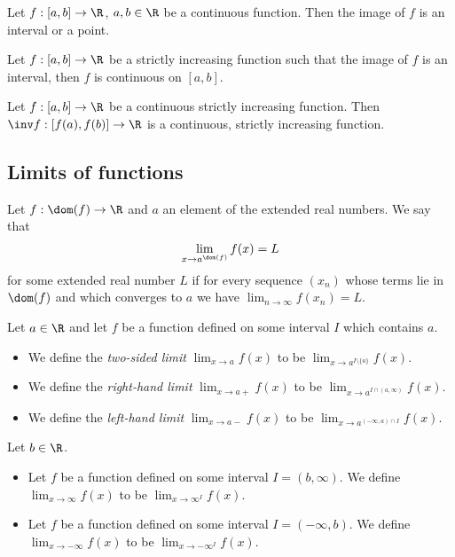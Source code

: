 \documentclass{article}
\begin{document}
\setcounter{theorem}{8}
\begin{theorem}
    Let $f:[a,b]\to\R$, $a,b\in\R$ be a continuous function. Then the
    image of $f$ is an interval or a point.
\end{theorem}

\begin{theorem}
    Let $f:[a,b]\to\R$ be a strictly increasing function such that
    the image of $f$ is an interval, then $f$ is continuous on $[a,b]$.
\end{theorem}

\begin{theorem}
    Let $f:[a,b]\to\R$ be a continuous strictly increasing function.
    Then $\inv f:[f(a),f(b)]\to\R$ is a continuous, strictly increasing
    function.
\end{theorem}

\subsection{Limits of functions}

\begin{definition}
    Let $f:\dom(f)\to\R$ and $a$ an element of the extended real numbers. We say
    that
    \begin{align*}
        \lim_{x\to a^{\dom(f)}}f(x)=L  
    \end{align*}
    for some extended real number $L$ if
    for every sequence $(x_n)$ whose terms lie in $\dom(f)$ and which converges
    to $a$ we have $\lim_{n\to\infty}f(x_n)=L$.
\end{definition}

\begin{definition}
    Let $a\in\R$ and let $f$ be a function defined on some interval
    $I$ which contains $a$.
    \begin{itemize}
        \item We define the \emph{two-sided limit} $\lim_{x\to a}f(x)$ to be $\lim_{x\to a^{I\setminus\{a\}}}f(x)$.
        \item We define the \emph{right-hand limit} $\lim_{x\to a+}f(x)$ to be $\lim_{x\to a^{I\cap (a, \infty)}}f(x)$.
        \item We define the \emph{left-hand limit} $\lim_{x\to a-}f(x)$ to be $\lim_{x\to a^{(-\infty,a)\cap I}}f(x)$.
    \end{itemize}
\end{definition}

\begin{definition}
    Let $b\in\R$.
    \begin{itemize}
        \item Let $f$ be a function defined on some interval $I=(b,\infty)$.
        We define $\lim_{x\to\infty}f(x)$ to be $\lim_{x\to\infty^I}f(x)$.
        \item Let $f$ be a function defined on some interval $I=(-\infty, b)$.
        We define $\lim_{x\to-\infty}f(x)$ to be $\lim_{x\to-\infty^I}f(x).$
    \end{itemize}
\end{definition}
\end{document}
